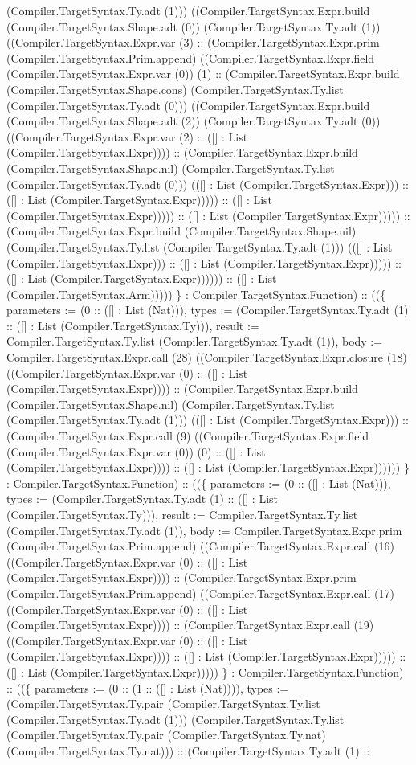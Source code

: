 \documentclass[11pt]{article}
\begin{document}
(Compiler.TargetSyntax.Ty.adt (1))) ((Compiler.TargetSyntax.Expr.build (Compiler.TargetSyntax.Shape.adt (0)) (Compiler.TargetSyntax.Ty.adt (1)) ((Compiler.TargetSyntax.Expr.var (3) :: (Compiler.TargetSyntax.Expr.prim (Compiler.TargetSyntax.Prim.append) ((Compiler.TargetSyntax.Expr.field (Compiler.TargetSyntax.Expr.var (0)) (1) :: (Compiler.TargetSyntax.Expr.build (Compiler.TargetSyntax.Shape.cons) (Compiler.TargetSyntax.Ty.list (Compiler.TargetSyntax.Ty.adt (0))) ((Compiler.TargetSyntax.Expr.build (Compiler.TargetSyntax.Shape.adt (2)) (Compiler.TargetSyntax.Ty.adt (0)) ((Compiler.TargetSyntax.Expr.var (2) :: ([] : List (Compiler.TargetSyntax.Expr)))) :: (Compiler.TargetSyntax.Expr.build (Compiler.TargetSyntax.Shape.nil) (Compiler.TargetSyntax.Ty.list (Compiler.TargetSyntax.Ty.adt (0))) (([] : List (Compiler.TargetSyntax.Expr))) :: ([] : List (Compiler.TargetSyntax.Expr))))) :: ([] : List (Compiler.TargetSyntax.Expr))))) :: ([] : List (Compiler.TargetSyntax.Expr))))) :: (Compiler.TargetSyntax.Expr.build (Compiler.TargetSyntax.Shape.nil) (Compiler.TargetSyntax.Ty.list (Compiler.TargetSyntax.Ty.adt (1))) (([] : List (Compiler.TargetSyntax.Expr))) :: ([] : List (Compiler.TargetSyntax.Expr))))) :: ([] : List (Compiler.TargetSyntax.Expr)))))) :: ([] : List (Compiler.TargetSyntax.Arm))))) \} : Compiler.TargetSyntax.Function) :: ((\{ parameters := (0 :: ([] : List (Nat))), types := (Compiler.TargetSyntax.Ty.adt (1) :: ([] : List (Compiler.TargetSyntax.Ty))), result := Compiler.TargetSyntax.Ty.list (Compiler.TargetSyntax.Ty.adt (1)), body := Compiler.TargetSyntax.Expr.call (28) ((Compiler.TargetSyntax.Expr.closure (18) ((Compiler.TargetSyntax.Expr.var (0) :: ([] : List (Compiler.TargetSyntax.Expr)))) :: (Compiler.TargetSyntax.Expr.build (Compiler.TargetSyntax.Shape.nil) (Compiler.TargetSyntax.Ty.list (Compiler.TargetSyntax.Ty.adt (1))) (([] : List (Compiler.TargetSyntax.Expr))) :: (Compiler.TargetSyntax.Expr.call (9) ((Compiler.TargetSyntax.Expr.field (Compiler.TargetSyntax.Expr.var (0)) (0) :: ([] : List (Compiler.TargetSyntax.Expr)))) :: ([] : List (Compiler.TargetSyntax.Expr)))))) \} : Compiler.TargetSyntax.Function) :: ((\{ parameters := (0 :: ([] : List (Nat))), types := (Compiler.TargetSyntax.Ty.adt (1) :: ([] : List (Compiler.TargetSyntax.Ty))), result := Compiler.TargetSyntax.Ty.list (Compiler.TargetSyntax.Ty.adt (1)), body := Compiler.TargetSyntax.Expr.prim (Compiler.TargetSyntax.Prim.append) ((Compiler.TargetSyntax.Expr.call (16) ((Compiler.TargetSyntax.Expr.var (0) :: ([] : List (Compiler.TargetSyntax.Expr)))) :: (Compiler.TargetSyntax.Expr.prim (Compiler.TargetSyntax.Prim.append) ((Compiler.TargetSyntax.Expr.call (17) ((Compiler.TargetSyntax.Expr.var (0) :: ([] : List (Compiler.TargetSyntax.Expr)))) :: (Compiler.TargetSyntax.Expr.call (19) ((Compiler.TargetSyntax.Expr.var (0) :: ([] : List (Compiler.TargetSyntax.Expr)))) :: ([] : List (Compiler.TargetSyntax.Expr))))) :: ([] : List (Compiler.TargetSyntax.Expr))))) \} : Compiler.TargetSyntax.Function) :: ((\{ parameters := (0 :: (1 :: ([] : List (Nat)))), types := (Compiler.TargetSyntax.Ty.pair (Compiler.TargetSyntax.Ty.list (Compiler.TargetSyntax.Ty.adt (1))) (Compiler.TargetSyntax.Ty.list (Compiler.TargetSyntax.Ty.pair (Compiler.TargetSyntax.Ty.nat) (Compiler.TargetSyntax.Ty.nat))) :: (Compiler.TargetSyntax.Ty.adt (1) :: 
\end{document}
